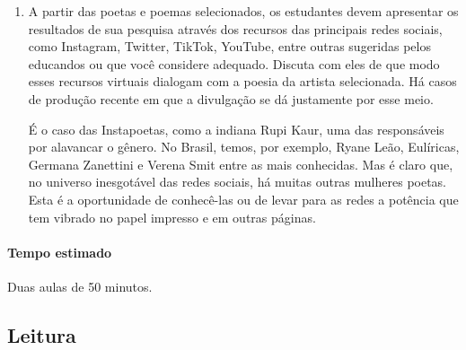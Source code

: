 \documentclass[12pt]{extarticle}
\begin{document}
\begin{enumerate}
\item A partir das poetas e poemas selecionados, os estudantes devem
apresentar os resultados de sua pesquisa através dos recursos das
principais redes sociais, como Instagram, Twitter, TikTok, YouTube,
entre outras sugeridas pelos educandos ou que você considere adequado.
Discuta com eles de que modo esses recursos virtuais dialogam com a
poesia da artista selecionada. Há casos de produção recente em que a
divulgação se dá justamente por esse meio. 


É o caso das Instapoetas, como a indiana Rupi Kaur, uma das responsáveis por alavancar o gênero.
No Brasil, temos, por exemplo, Ryane Leão, Eulíricas, Germana Zanettini
e Verena Smit entre as mais conhecidas. Mas é claro que, no universo
inesgotável das redes sociais, há muitas outras mulheres poetas. Esta é
a oportunidade de conhecê-las ou de levar para as redes a potência que
tem vibrado no papel impresso e em outras páginas.
\end{enumerate}

\paragraph{Tempo estimado} Duas aulas de 50 minutos.

\subsection{Leitura}
\end{document}
